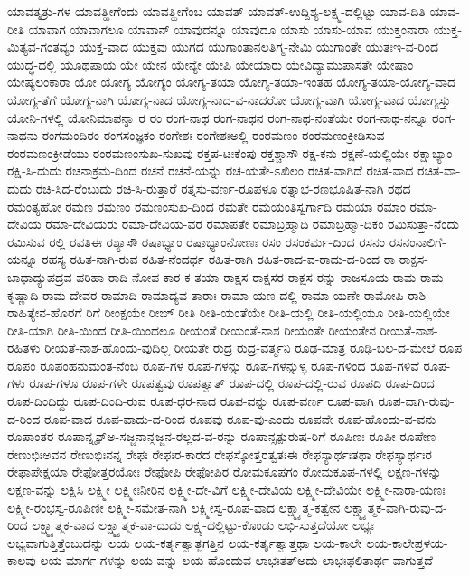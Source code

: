 {ಯಾವತ್ಶತ್ರು-ಗಳ
ಯಾವತ್ಹೀಗೆಂದು
ಯಾವತ್ಹೀಗೆಂಬ
ಯಾವತ್
ಯಾವತ್-ಉದ್ದಿಶ್ಯ-ಲಕ್ಷ್ಮ-ದಲ್ಲಿಟ್ಟು
ಯಾವ-ದಿತಿ
ಯಾವ-ರೀತಿ
ಯಾವಾಗ
ಯಾವಾಗಲೂ
ಯಾವಾನ್
ಯಾವುದನ್ನೂ
ಯಾವುದೂ
ಯಾಸು
ಯಾಸು-ಯಾವ
ಯುಕ್ತಂನಾರಾ
ಯುಕ್ತ-ಮಿತ್ಯವ-ಗಂತವ್ಯಂ
ಯುಕ್ತ-ವಾದ
ಯುಕ್ತವು
ಯುಗದ
ಯುಗಾಂತಾನಲತಿಗ್ಮ-ನೇಮಿ
ಯುಗಾಂತೇ
ಯುತಃಇ-ವ-ರಿಂದ
ಯುದ್ಧ-ದಲ್ಲಿ
ಯೂಥಪಾಯ
ಯೇ
ಯೇನ
ಯೇನ್ಯೇ
ಯೇಪಿ
ಯೇಯಾರು
ಯೇವಿದ್ಯಾಮುಪಾಸತೇ
ಯೇಷಾಂ
ಯೇಷ್ಯಲಂಕಾರಾ
ಯೋ
ಯೋಗ್ಯ
ಯೋಗ್ಯಂ
ಯೋಗ್ಯ-ತಯಾ
ಯೋಗ್ಯ-ತಯಾ-ಇಂತಹ
ಯೋಗ್ಯ-ತಯಾ-ಯೋಗ್ಯ-ವಾದ
ಯೋಗ್ಯ-ತೆಗೆ
ಯೋಗ್ಯ-ನಾಗಿ
ಯೋಗ್ಯ-ನಾದ
ಯೋಗ್ಯ-ನಾದ-ವ-ನಾದರೋ
ಯೋಗ್ಯ-ವಾಗಿ
ಯೋಗ್ಯ-ವಾದ
ಯೋಗ್ಯಸ್ತು
ಯೋನಿ-ಗಳಲ್ಲಿ
ಯೋನಿಮಾಪನ್ನಾ
ರ
ರಂ
ರಂಗ-ನಾಥ
ರಂಗ-ನಾಥನ
ರಂಗ-ನಾಥ-ನಂತೆಯೇ
ರಂಗ-ನಾಥ-ನನ್ನೂ
ರಂಗ-ನಾಥನು
ರಂಗಮಂದಿರಂ
ರಂಗಸಂಜ್ಞಕಂ
ರಂಗೇಶಃ
ರಂಗೇಶಃಅಲ್ಲಿ
ರಂರಮಣಂ
ರಂರಮಣಂಕ್ರೀಡಿಸುವ
ರಂರಮಣಂಕ್ರೀಡೆಯು
ರಂರಮಣಂಸುಖ-ಸುಖವು
ರಕ್ತಪ-ಟಃಕೆಂಪು
ರಕ್ತಶ್ಚಾಸೌ
ರಕ್ಷ-ಕನು
ರಕ್ಷಣೆ-ಯಲ್ಲಿಯೇ
ರಕ್ಷಾಭ್ಯಾಂ
ರಕ್ಷಿ-ಸಿ-ದುದು
ರಚನಾಕ್ರಮ-ದಿಂದ
ರಚನೆ
ರಚನೆ-ಯನ್ನು
ರಚ-ಯತೇ-ಽಖಿಲಂ
ರಚಿತ-ವಾಗಿದೆ
ರಚಿತ-ವಾದ
ರಚಿತ-ವಾ-ದುದು
ರಚಿ-ಸಿದ-ರೆಂಬುದು
ರಚಿ-ಸಿ-ರುತ್ತಾರೆ
ರತ್ನಸು-ವರ್ಣ-ರೂಪಳೂ
ರತ್ನಾಭ-ರಣಭೂಷಿತ-ನಾಗಿ
ರಥದ
ರಮಂತ್ಯಹೋ
ರಮಣ
ರಮಣಂ
ರಮಣಂಸುಖ-ದಿಂದ
ರಮತೇ
ರಮಯಂತಿಸ್ವರ್ಗಾದಿ
ರಮಯಾ
ರಮಾಂ
ರಮಾ-ದೇವಿಯ
ರಮಾ-ದೇವಿಯರು
ರಮಾ-ದೇವಿಯ-ವರ
ರಮಾಪತೇ
ರಮಾಬ್ರಹ್ಮಾದಿ
ರಮಾಬ್ರಹ್ಮಾ-ದಿಕಂ
ರಮಿಸುತ್ತಾ-ನೆಂದು
ರಮಿಸುವ
ರಲ್ಲಿ
ರವತಿಈ
ರಶ್ಯಾಸೌ
ರಷಾಭ್ಯಾಂ
ರಷಾಭ್ಯಾಂನೋಣಃ
ರಸಂ
ರಸಂಕರ್ಮ-ದಿಂದ
ರಸನಂ
ರಸನಂನಾಲಿಗೆ-ಯನ್ನೂ
ರಹಸ್ಯ
ರಹಿತ-ನಾಗಿ-ರುವ
ರಹಿತ-ನೆಂದರ್ಥ
ರಹಿತ-ರಾಗಿ
ರಹಿತ-ರಾದ-ವ-ರಾದು-ದ-ರಿಂದ
ರಾ
ರಾಕ್ಷಸ-ಬಾಧಾದ್ಯುಪದ್ರವ-ಪರಿಹಾ-ರಾದಿ-ನೋಪ-ಕಾರ-ಕ-ತಯಾ-ರಾಕ್ಷಸ
ರಾಕ್ಷಸರ
ರಾಕ್ಷಸ-ರನ್ನು
ರಾಜಸೂಯ
ರಾಮ
ರಾಮ-ಕೃಷ್ಣಾದಿ
ರಾಮ-ದೇವರ
ರಾಮಾದಿ
ರಾಮಾದ್ಯವ-ತಾರಾಃ
ರಾಮಾ-ಯಣ-ದಲ್ಲಿ
ರಾಮಾ-ಯಣೇ
ರಾಮೋಪಿ
ರಾಶಿ
ರಾಹಿತ್ಯೇನ-ಹೊರಗೆ
ರಿಗೆ
ರೀಂಕ್ಷಯೇ
ರೀಙ್
ರೀತಿ
ರೀತಿ-ಯಂತೆಯೇ
ರೀತಿ-ಯಲ್ಲಿ
ರೀತಿ-ಯಲ್ಲಿಯೂ
ರೀತಿ-ಯಲ್ಲಿಯೇ
ರೀತಿ-ಯಾಗಿ
ರೀತಿ-ಯಿಂದ
ರೀತಿ-ಯಿಂದಲೂ
ರೀಯಂತೆ
ರೀಯಂತೆ-ನಾಶ
ರೀಯಂತೇ
ರೀಯಂತೇನ
ರೀಯತೆ-ನಾಶ-ರಹಿತಳು
ರೀಯತೆ-ನಾಶ-ಹೊಂದು-ವುದಿಲ್ಲ
ರೀಯತೇ
ರುದ್ರ
ರುದ್ರ-ವರ್ತ್ಮನಿ
ರೂಢ-ಮಾತ್ರ
ರೂಢಿ-ಬಲ-ದ-ಮೇಲೆ
ರೂಪ
ರೂಪಂ
ರೂಪಂಹನುಮಂತ-ನೆಂಬ
ರೂಪ-ಗಳ
ರೂಪ-ಗಳನ್ನು
ರೂಪ-ಗಳನ್ನುಳ್ಳ
ರೂಪ-ಗಳಿಂದ
ರೂಪ-ಗಳಿವೆ
ರೂಪ-ಗಳು
ರೂಪ-ಗಳೂ
ರೂಪ-ಗಳೇ
ರೂಪತ್ವವು
ರೂಪತ್ವಾತ್
ರೂಪ-ದಲ್ಲಿ
ರೂಪ-ದಲ್ಲಿ-ರುವ
ರೂಪದಿ
ರೂಪ-ದಿಂದ
ರೂಪ-ದಿಂದಿದ್ದು
ರೂಪ-ದಿಂದಿ-ರುವ
ರೂಪ-ಧರ-ನಾದ
ರೂಪ-ವನ್ನು
ರೂಪ-ವರ್ಣ
ರೂಪ-ವಾಗಿ
ರೂಪ-ವಾಗಿ-ರುವು-ದ-ರಿಂದ
ರೂಪ-ವಾದ
ರೂಪ-ವಾದು-ದ-ರಿಂದ
ರೂಪವು
ರೂಪ-ವು-ಎಂದು
ರೂಪವೇ
ರೂಪ-ಹೊಂದು-ವ-ವನು
ರೂಪಾಂತರ
ರೂಪಾನ್ನೄನ್ಅ-ಸಜ್ಜನಾನ್ಸಜ್ಜನ-ರಲ್ಲದ-ವ-ರನ್ನು
ರೂಪಾನ್ಸತ್ಪುರುಷ-ರಿಗೆ
ರೂಪಿಣಃ
ರೂಪೀ
ರೂಪೇಣ
ರೇಣುಭಿಃಅವನ
ರೇಣುಭಿಃನನ್ನ
ರೇಫಃ
ರೇಫಃರ-ಕಾರದ
ರೇಫಸ್ಕೋತ್ತರತ್ವತಃಈ
ರೇಫಸ್ಯಾರ್ಥಃತಥಾ
ರೇಫಸ್ಯಾರ್ಥಃರ
ರೇಫಾಪೇಕ್ಷಯಾ
ರೇಫೋತ್ತರಯೋಃ
ರೇಫೋಪಿ
ರೇಫೋಪಿರ
ರೋಮಕೂಪಗಂ
ರೋಮಕೂಪ-ಗಳಲ್ಲಿ
ಲಕ್ಷಣ-ಗಳನ್ನು
ಲಕ್ಷಣ-ವನ್ನು
ಲಕ್ಷಿಸಿ
ಲಕ್ಷ್ಮೀ
ಲಕ್ಷ್ಮೀಃನೀರಿನ
ಲಕ್ಷ್ಮೀ-ದೇ-ವಿಗೆ
ಲಕ್ಷ್ಮೀ-ದೇವಿಯ
ಲಕ್ಷ್ಮೀ-ದೇವಿಯೇ
ಲಕ್ಷ್ಮೀ-ನಾರಾ-ಯಣಃ
ಲಕ್ಷ್ಮೀ-ರಂಭಸ್ವ-ರೂಪಿಣೀ
ಲಕ್ಷ್ಮೀ-ಸಮೇತ-ನಾಗಿ
ಲಕ್ಷ್ಮೀಸ್ವ-ರೂಪ-ವಾದ
ಲಕ್ಷ್ಮ್ಯಾತ್ಮ-ಕತ್ವೇನ
ಲಕ್ಷ್ಮ್ಯಾತ್ಮಕ-ವಾಗಿ-ರುವು-ದ-ರಿಂದ
ಲಕ್ಷ್ಮ್ಯಾತ್ಮಕ-ವಾದ
ಲಕ್ಷ್ಮ್ಯಾತ್ಮಕ-ವಾ-ದುದು
ಲಕ್ಷ್ಯ-ದಲ್ಲಿಟ್ಟು-ಕೊಂಡು
ಲಭಿ-ಸುತ್ತದೆಯೋ
ಲಭ್ಯಃ
ಲಭ್ಯವಾಗುತ್ತಿತ್ತೆಂಬುದನ್ನು
ಲಯ
ಲಯ-ಕರ್ತೃತ್ವಾತ್ಜಗತ್ತಿನ
ಲಯ-ಕರ್ತೃತ್ವಾತ್ತಥಾ
ಲಯ-ಕಾಲೇ
ಲಯ-ಕಾಲೇಪ್ರಳಯ-ಕಾಲವು
ಲಯ-ಮಾರ್ಗ-ಗಳನ್ನು
ಲಯ-ವನ್ನು
ಲಯ-ಹೊಂದುವ
ಲಾಭಃತತ್ಅದು
ಲಾಭಃಫಲಿತಾರ್ಥ-ವಾಗುತ್ತದೆ
}
